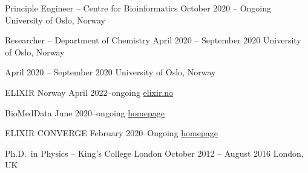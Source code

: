 \documentclass[10pt,a4paper,ragged2e,withhyper]{altacv}
\begin{document}
\begin{paracol}{2}

\cvevent{}
        {Principle Engineer -- Centre for Bioinformatics}
        {October 2020 -- Ongoing}
        {University of Oslo, Norway}

        \cvevent{}
                {Researcher -- Department of Chemistry}
                {April 2020 -- September 2020}
                {University of Oslo, Norway}


                        {April 2020 -- September 2020}
                        {University of Oslo, Norway}


\cveventbis{}
        {ELIXIR Norway}
        {April 2022--ongoing}
        {
          \href{https://elixir.no/}
               {elixir.no}
        }

\cveventbis{}
        {BioMedData}
        {June 2020–ongoing}
        {
          \href{https://elixir.no/organization/biomeddata}
               {homepage}
        }

\cveventbis{}
        {ELIXIR CONVERGE}
        {February 2020–Ongoing}
        {
          \href{https://elixir-europe.org/about-us/how-funded/eu-projects/converge}
               {homepage}
        }


\cvevent{}
        {Ph.D.\ in Physics -- King's College London}
        {October 2012 -- August 2016}
        {London, UK}


\end{paracol}
\end{document}
